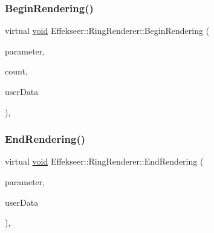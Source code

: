 \subsubsection{\texorpdfstring{Begin\+Rendering()}{BeginRendering()}}
{\footnotesize\ttfamily virtual \mbox{\hyperlink{namespace_effekseer_ab34c4088e512200cf4c2716f168deb56}{void}} Effekseer\+::\+Ring\+Renderer\+::\+Begin\+Rendering (\begin{DoxyParamCaption}\item[{const \mbox{\hyperlink{struct_effekseer_1_1_ring_renderer_1_1_node_parameter}{Node\+Parameter}} \&}]{parameter,  }\item[{int32\+\_\+t}]{count,  }\item[{\mbox{\hyperlink{namespace_effekseer_ab34c4088e512200cf4c2716f168deb56}{void}} $\ast$}]{user\+Data }\end{DoxyParamCaption})\hspace{0.3cm}{\ttfamily [inline]}, {\ttfamily [virtual]}}

\mbox{\label{class_effekseer_1_1_ring_renderer_a681963d704b42577665a10722140eb34}} 
\subsubsection{\texorpdfstring{End\+Rendering()}{EndRendering()}}
{\footnotesize\ttfamily virtual \mbox{\hyperlink{namespace_effekseer_ab34c4088e512200cf4c2716f168deb56}{void}} Effekseer\+::\+Ring\+Renderer\+::\+End\+Rendering (\begin{DoxyParamCaption}\item[{const \mbox{\hyperlink{struct_effekseer_1_1_ring_renderer_1_1_node_parameter}{Node\+Parameter}} \&}]{parameter,  }\item[{\mbox{\hyperlink{namespace_effekseer_ab34c4088e512200cf4c2716f168deb56}{void}} $\ast$}]{user\+Data }\end{DoxyParamCaption})\hspace{0.3cm}{\ttfamily [inline]}, {\ttfamily [virtual]}}

\mbox{\label{class_effekseer_1_1_ring_renderer_ac43fd38e8d1dc8c8916518a6e4ed6c22}} 
